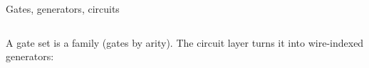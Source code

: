 \begin{frame}{Gates, generators, circuits \InPaper}
\begin{columns}[c]
\begin{column}{0.58\textwidth}
A gate set is a family  (gates by arity). The circuit
layer turns it into \alert{wire-indexed generators}:
\begin{code}%
\>[0]\AgdaSpace{}%
\AgdaSpace{}%
\AgdaSymbol{:}\AgdaSpace{}%
\AgdaSpace{}%
\AgdaSpace{}%
\AgdaSpace{}%
\<%
\\
\>[0][@{}l@{\AgdaIndent{0}}]%
\>[2]\AgdaSpace{}%
\AgdaSymbol{:}\AgdaSpace{}%
\AgdaSpace{}%
\<%
\\
\>[0]\AgdaSpace{}%
\AgdaSpace{}%
\AgdaSymbol{:}\AgdaSpace{}%
\AgdaSpace{}%
\AgdaSpace{}%
\AgdaSpace{}%
\<%
\\
\>[0][@{}l@{\AgdaIndent{0}}]%
\>[2]\AgdaSpace{}%
\AgdaSymbol{:}\AgdaSpace{}%
\AgdaSpace{}%
\AgdaSpace{}%
\AgdaSpace{}%
\AgdaSpace{}%
\AgdaSymbol{(}\AgdaSpace{}%
\AgdaSymbol{)}%
\>[31]\<%
\\
%
\>[2]\AgdaSpace{}%
\AgdaSymbol{:}\AgdaSpace{}%
\AgdaSpace{}%
\AgdaSpace{}%
\AgdaSpace{}%
\AgdaSpace{}%
\AgdaSymbol{(}\AgdaSpace{}%
\AgdaSymbol{)}%
\>[31]\<%
\\
%
\>[2]%
\>[7]\AgdaSymbol{:}\AgdaSpace{}%
\AgdaSpace{}%
\AgdaSpace{}%
\AgdaSpace{}%
\AgdaSpace{}%
\AgdaSymbol{(}\AgdaSpace{}%
\AgdaSymbol{)}%
\>[31]\<%
\end{code}
\begin{code}[hide]%
\>[0]\AgdaSpace{}%
\AgdaSymbol{:}\AgdaSpace{}%
\AgdaSpace{}%
\AgdaSpace{}%
\<%
\\
\>[0]\AgdaSpace{}%

\end{code}
\end{column}
\end{columns}
\end{frame}
